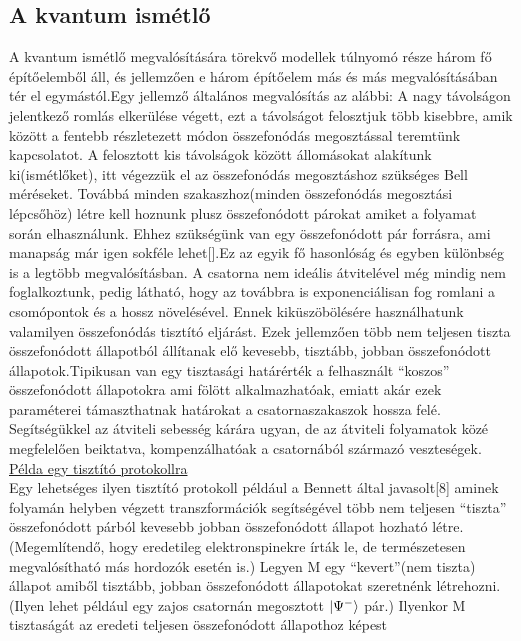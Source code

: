\subsection{A kvantum ismétlő}
A kvantum ismétlő megvalósítására törekvő modellek túlnyomó része három fő építőelemből áll, és jellemzően e három építőelem más és más megvalósításában tér el egymástól.Egy jellemző általános megvalósítás az alábbi:
A nagy távolságon jelentkező romlás elkerülése végett, ezt a távolságot felosztjuk több kisebbre, amik között a fentebb részletezett módon összefonódás megosztással teremtünk kapcsolatot. A felosztott kis távolságok között állomásokat alakítunk ki(ismétlőket), itt végezzük el az összefonódás megosztáshoz szükséges Bell méréseket. Továbbá minden szakaszhoz(minden összefonódás megosztási lépcsőhöz) létre kell hoznunk plusz összefonódott párokat amiket a folyamat során elhasználunk. Ehhez szükségünk van egy összefonódott pár forrásra, ami manapság már igen sokféle lehet[].Ez az egyik fő hasonlóság és egyben különbség is a legtöbb megvalósításban. A csatorna nem ideális átvitelével még mindig nem foglalkoztunk, pedig látható, hogy az továbbra is exponenciálisan fog romlani a csomópontok és a hossz növelésével. Ennek kiküszöbölésére használhatunk valamilyen összefonódás tisztító eljárást. Ezek jellemzően több nem teljesen tiszta összefonódott állapotból állítanak elő kevesebb, tisztább, jobban összefonódott állapotok.Tipikusan van egy tisztasági határérték a felhasznált “koszos” összefonódott állapotokra ami fölött alkalmazhatóak, emiatt akár ezek paraméterei támaszthatnak határokat a csatornaszakaszok hossza felé. Segítségükkel az átviteli sebesség kárára ugyan, de az átviteli folyamatok közé megfelelően beiktatva, kompenzálhatóak a csatornából származó veszteségek. \\
\underline{Példa egy tisztító protokollra}\\
Egy lehetséges ilyen tisztító protokoll például a Bennett által javasolt[8] aminek folyamán helyben végzett transzformációk segítségével több nem teljesen “tiszta” összefonódott párból kevesebb jobban összefonódott állapot hozható létre. (Megemlítendő, hogy eredetileg elektronspinekre írták le, de természetesen megvalósítható más hordozók esetén is.) Legyen M egy “kevert”(nem tiszta) állapot amiből tisztább, jobban összefonódott állapotokat szeretnénk létrehozni. (Ilyen lehet például egy zajos csatornán megosztott $ \ket{\Psi^-} $  pár.) Ilyenkor M tisztaságát az eredeti teljesen összefonódott állapothoz képest 




